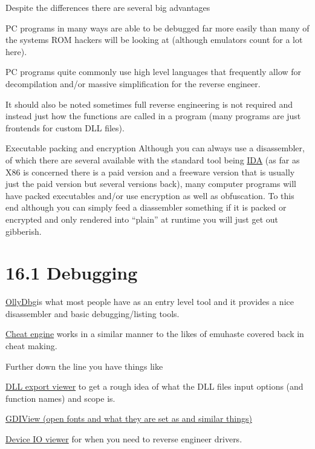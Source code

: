 \documentclass[
]{book}
\begin{document}
Despite the differences there are several big advantages

PC programs in many ways are able to be debugged far more easily than many of the systems ROM hackers will be looking at (although emulators count for a lot here).

PC programs quite commonly use high level languages that frequently allow for decompilation and/or massive simplification for the reverse engineer.

It should also be noted sometimes full reverse engineering is not required and instead just how the functions are called in a program (many programs are just frontends for custom DLL files).

Executable packing and encryption Although you can always use a disassembler, of which there are several available with the standard tool being \href{http://www.hex-rays.com/products/ida/index.shtml}{IDA} (as far as X86 is concerned there is a paid version and a freeware version that is usually just the paid version but several versions back), many computer programs will have packed executables and/or use encryption as well as obfuscation. To this end although you can simply feed a diassembler something if it is packed or encrypted and only rendered into ``plain'' at runtime you will just get out gibberish.

\hypertarget{debugging}{%
\section{16.1 Debugging}\label{debugging}}

\href{http://www.ollydbg.de/}{OllyDbg}is what most people have as an entry level tool and it provides a nice disassembler and basic debugging/listing tools.

\href{http://cheatengine.org/}{Cheat engine} works in a similar manner to the likes of emuhaste covered back in cheat making.

Further down the line you have things like

\href{http://www.nirsoft.net/utils/dll_export_viewer.html}{DLL export viewer} to get a rough idea of what the DLL files input options (and function names) and scope is.

\href{http://www.nirsoft.net/utils/gdi_handles.html}{GDIView (open fonts and what they are set as and similar things)}

\href{http://www.nirsoft.net/utils/device_io_view.html}{Device IO viewer} for when you need to reverse engineer drivers.
\end{document}
